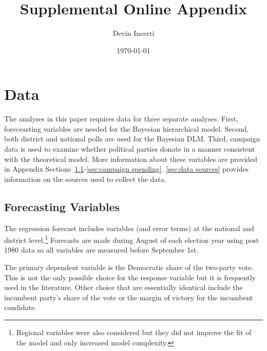 \documentclass[12pt,final,fleqn]{article}
\theoremstyle{plain}
\begin{document}
\author{Devin Incerti}
\title{\textbf{Supplemental Online Appendix}}
\date{\today}
\maketitle

\tableofcontents
\listoffigures
\listoftables

\clearpage
\doublespacing

\section{Data}
The analyses in this paper requires data for three separate analyses. First, foreceasting variables are needed for the Bayesian hierarchical model. Second, both district and national polls are used for the Bayesian DLM. Third, campaign data is used to examine whether political parties donate in a manner consistent with the theoretical model. More information about these variables are provided in Appendix Sections~\ref{sec:forecast vars}-\ref{sec:campaign spending}. \autoref{sec:data sources} provides information on the sources used to collect the data.

\subsection{Forecasting Variables} \label{sec:forecast vars}
The regression forecast includes variables (and error terms) at the national and district level.\footnote{Regional variables were also considered but they did not improve the fit of the model and only increased model complexity.} Forecasts are made during August of each election year using post 1980 data so all variables are measured before September 1st.

The primary dependent variable is the Democratic share of the two-party vote. This is not the only possible choice for the response variable but it is frequently used in the literature. Other choice that are essentially identical include the incumbent party's share of the vote or the margin of victory for the incumbent candidate.
\end{document}
